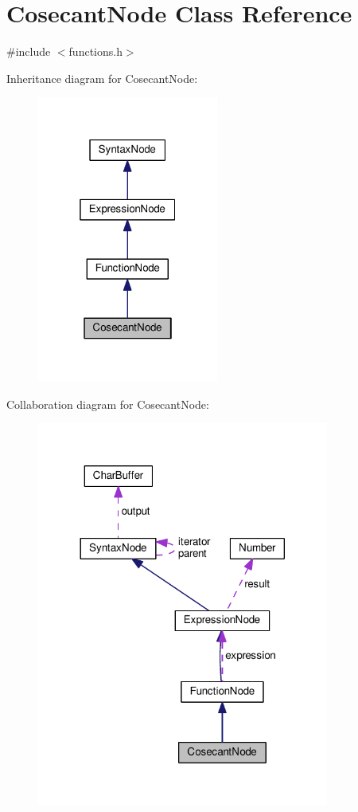 \hypertarget{classCosecantNode}{}\section{Cosecant\+Node Class Reference}
\label{classCosecantNode}


{\ttfamily \#include $<$functions.\+h$>$}



Inheritance diagram for Cosecant\+Node\+:
\nopagebreak
\begin{figure}[H]
\begin{center}
\leavevmode
\includegraphics[width=169pt]{d9/d74/classCosecantNode__inherit__graph}
\end{center}
\end{figure}


Collaboration diagram for Cosecant\+Node\+:
\nopagebreak
\begin{figure}[H]
\begin{center}
\leavevmode
\includegraphics[width=272pt]{da/d42/classCosecantNode__coll__graph}
\end{center}
\end{figure}
